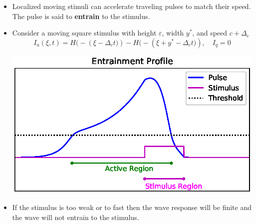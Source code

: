 \documentclass[landscape,final]{baposter}
\begin{document}
\begin{poster}
{
	\begin{itemize}
		\item Localized moving stimuli can accelerate traveling pulses to match their speed. The pulse is said to \textbf{entrain} to the stimulus.
		\item Consider a moving square stimulus with height $\varepsilon$, width $y^*$, and speed $c + \Delta_c$
		$$
			I_u(\xi, t) = H\big(-(\xi -\Delta_c t\big)) - H\big(-(\xi + y^* - \Delta_c t\big)), \quad I_q = 0
		$$
		\begin{center}
					\includegraphics[width=.9\linewidth, trim={0cm, .2cm, 0cm, .2cm}, clip=true]{entrainment_square_profile}
				\end{center}
		\item If the stimulus is too weak or to fast then the wave response will be finite and the wave will not entrain to the stimulus.
		

\end{itemize}}
\end{poster}
\end{document}
